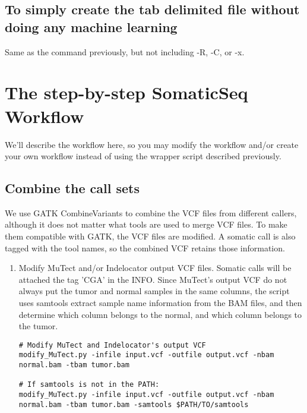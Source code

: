 \documentclass[10pt,letterpaper]{article}
\begin{document}
\begin{sloppypar}
\begin{lstlisting}
\end{lstlisting}





\subsection{To simply create the tab delimited file without doing any machine learning}

Same as the command previously, but not including -R, -C, or -x. 






\section{The step-by-step SomaticSeq Workflow}

We'll describe the workflow here, so you may modify the workflow and/or create your own workflow instead of using the wrapper script described previously. 


\subsection{Combine the call sets}
	We use GATK CombineVariants to combine the VCF files from different callers, although it does not matter what tools are used to merge VCF files. To make them compatible with GATK, the VCF files are modified. A somatic call is also tagged with the tool names, so the combined VCF retains those information. 

\begin{enumerate}

\item 
Modify MuTect and/or Indelocator output VCF files. Somatic calls will be attached the tag 'CGA' in the INFO. 
Since MuTect's output VCF do not always put the tumor and normal samples in the same columns, the script uses samtools extract sample name information from the BAM files, and then determine which column belongs to the normal, and which column belongs to the tumor. 
	
\begin{lstlisting}
# Modify MuTect and Indelocator's output VCF
modify_MuTect.py -infile input.vcf -outfile output.vcf -nbam normal.bam -tbam tumor.bam
	
# If samtools is not in the PATH:
modify_MuTect.py -infile input.vcf -outfile output.vcf -nbam normal.bam -tbam tumor.bam -samtools $PATH/TO/samtools
\end{lstlisting}
	

\end{enumerate}
\end{sloppypar}
\end{document}
